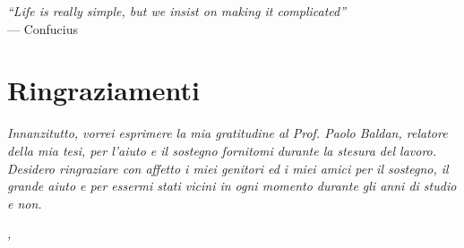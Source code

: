 
{}
{}

\begin{flushright}{
	\slshape    
	``Life is really simple, but we insist on making it complicated''} \\ 
	\medskip
    --- Confucius
\end{flushright}


\bigskip

\begingroup
\let\clearpage\relax
\let\cleardoublepage\relax
\let\cleardoublepage\relax

\newpage

\chapter*{Ringraziamenti}

\noindent \textit{Innanzitutto, vorrei esprimere la mia gratitudine al Prof. Paolo Baldan, relatore della mia tesi, per l'aiuto e il sostegno fornitomi durante la stesura del lavoro.}\\

\noindent \textit{Desidero ringraziare con affetto i miei genitori ed i miei amici per il sostegno, il grande aiuto e per essermi stati vicini in ogni momento durante gli anni di studio e non.}\\

\bigskip

\noindent\textit{\myLocation, \myTime}
\hfill \myName

\endgroup

\newpage